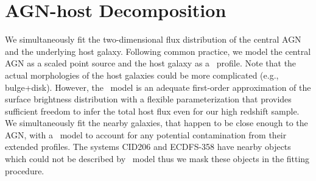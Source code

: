 \documentclass[apj]{emulateapj}
\begin{document}
\section{AGN-host Decomposition}
\label{sec:analysis}
We simultaneously fit the two-dimensional flux distribution of the central AGN and the underlying host galaxy. Following common practice, we model the central AGN as a scaled point source and the host galaxy as a \sersic\ profile. Note that the actual morphologies of the host galaxies could be more complicated (e.g., bulge+disk). However, the \sersic\ model is an adequate first-order approximation of the surface brightness distribution with a flexible parameterization that provides sufficient freedom to infer the total host flux even for our high redshift sample. We simultaneously fit the nearby galaxies, that happen to be close enough to the AGN, with a \sersic\ model to account for any potential contamination from their extended profiles. The systems CID206 and ECDFS-358 have nearby objects which could not be described by \sersic\ model thus we mask these objects in the fitting procedure.
\end{document}
